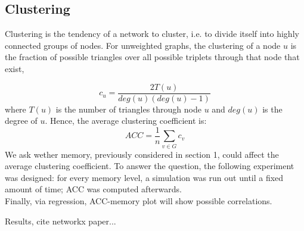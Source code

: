 \subsection{Clustering}
Clustering is the tendency of a network to cluster, i.e. to divide itself into highly connected groups of nodes.
For unweighted graphs, the clustering of a node $u$ is the fraction of possible triangles over all possible triplets  through that node that exist,

$$
c_u = \frac{2 T(u)}{deg(u)(deg(u)-1)}
$$
where $T(u)$ is the number of triangles through node $u$ and $deg(u)$ is the degree of $u$.
Hence, the average clustering coefficient  is:
$$
ACC = \frac{1}{n}\sum_{v \in G} c_v
$$
We ask wether memory, previously considered in section 1, could affect the average clustering coefficient.
To answer the question, the following experiment was designed:
for every memory level, a simulation was run out until a fixed amount of time; ACC was computed afterwards.\\
Finally, via regression,  ACC-memory plot will show possible correlations. 

Results, cite networkx paper...